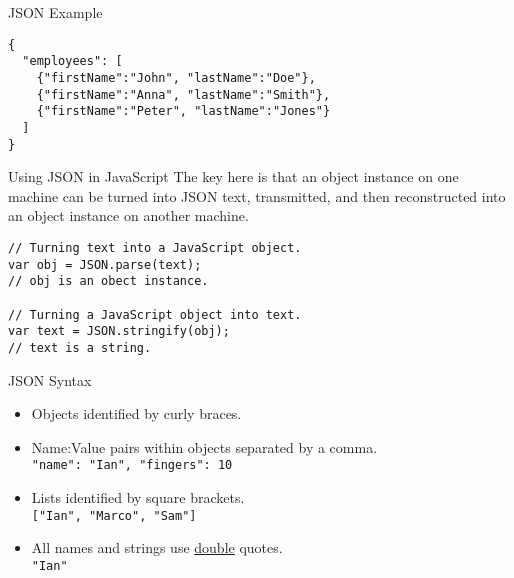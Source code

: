 \begin{frame}[fragile]{JSON Example}
  \begin{verbatim}
{
  "employees": [
    {"firstName":"John", "lastName":"Doe"},
    {"firstName":"Anna", "lastName":"Smith"},
    {"firstName":"Peter", "lastName":"Jones"}
  ]
}
  \end{verbatim}
\end{frame}


\begin{frame}[fragile]{Using JSON in JavaScript}
  The key here is that an object instance on one machine can be turned into JSON text, transmitted, and then reconstructed into an object instance on another machine. 
  \begin{verbatim}
// Turning text into a JavaScript object.
var obj = JSON.parse(text);
// obj is an obect instance.

// Turning a JavaScript object into text.
var text = JSON.stringify(obj);
// text is a string.
  \end{verbatim}
\end{frame}

\begin{frame}{JSON Syntax}
  \begin{itemize}
    \item Objects identified by curly braces. \\
    \hspace{0.5cm} \texttt{{}}
    \item Name:Value pairs within objects separated by a comma. \\
    \hspace{0.5cm} \texttt{{"name": "Ian", "fingers": 10}}
    \item Lists identified by square brackets. \\
    \hspace{0.5cm} \texttt{["Ian", "Marco", "Sam"]}
    \item All names and strings use \underline{double} quotes. \\
    \hspace{0.5cm} \texttt{"Ian"}
  \end{itemize}
\end{frame}

